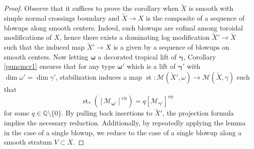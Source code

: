 \documentclass[12pt, oneside]{amsart}   	%
\newcommand{\vir}{\operatorname{vir}}
\newcommand{\st}{\operatorname{st}}
\numberwithin{equation}{section}
\numberwithin{thm}{section}
\numberwithin{figure}{section}
\begin{document}
\begin{proof}
Observe that it suffices to prove the corollary when $\widetilde{X}$ is smooth with simple normal crossings boundary and $\widetilde{X} \rightarrow X$ is the composite of a sequence of blowups along smooth centers. Indeed, such blowups are cofinal among toroidal modifications of $X$, hence there exists a dominating log modification $\widetilde{X}' \rightarrow \widetilde{X}$ such that the induced map $\widetilde{X}' \rightarrow X$ is a given by a sequence of blowups on smooth centers. Now letting $\pmb\omega$ a decorated tropical lift of $\pmb\gamma$, Corollary \ref{puncmcr1} ensures that for any type $\pmb\omega'$ which is a lift of $\pmb\gamma'$ with $\dim \omega' = \dim\gamma'$, stabilization induces a map $\st: \mathscr{M}(\widetilde{X}',\omega) \rightarrow \mathscr{M}(\widetilde{X},\gamma)$ such that $$\st_*([\mathscr{M}_{\pmb\omega'}]^{\vir}) = q[\mathscr{M}_{\pmb\gamma'}]^{\vir}$$ for some $q \in \mathbb{Q}\setminus \{0\}$. By pulling back insertions to $\widetilde{X}'$, the projection formula implies the necessary reduction. Additionally, by repeatedly applying the lemma in the case of a single blowup, we reduce to the case of a single blowup along a smooth stratum $V \subset X$. 









\end{proof}
\end{document}
